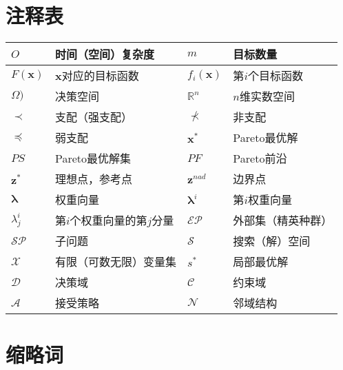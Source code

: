 
\chapter*{注释表}

\noindent\begin{longtabu} to \hline
$O$ & 时间（空间）复杂度 & $m$ & 目标数量 \\ \hline
$F(\mathbf{x})$ & $\mathbf{x}$对应的目标函数 & $f_i(\mathbf{x})$ & 第$i$个目标函数 \\ \hline
$\Omega)$ & 决策空间 & $\mathbb{R}^n$ & $n$维实数空间 \\ \hline
$\prec$ & 支配（强支配） & $\not \prec$ & 非支配 \\ \hline
$\preceq$ & 弱支配 & $\mathbf{x}^*$ & Pareto最优解  \\ \hline 
$PS$ & Pareto最优解集 & $PF$ & Pareto前沿\\ \hline 
$\mathbf{z}^*$ & 理想点，参考点 & $\mathbf{z}^{nad}$ & 边界点 \\ \hline
$\boldsymbol{\lambda}$ & 权重向量 & $\boldsymbol{\lambda}^i$ & 第$i$权重向量 \\ \hline
$\lambda^i_j$ & 第$i$个权重向量的第$j$分量 & $\mathcal{EP}$ & 外部集（精英种群） \\ \hline
$\mathcal{SP}$ & 子问题 & $\mathcal{S}$ & 搜索（解）空间 \\ \hline
$\mathcal{X}$ & 有限（可数无限）变量集 & $s^*$ & 局部最优解 \\ \hline
$\mathcal{D}$ & 决策域 & $\mathcal{C}$ & 约束域 \\ \hline
$\mathcal{A}$ & 接受策略 & $\mathcal{N}$ & 邻域结构 \\ \hline

\end{longtabu}

\chapter*{缩略词}

